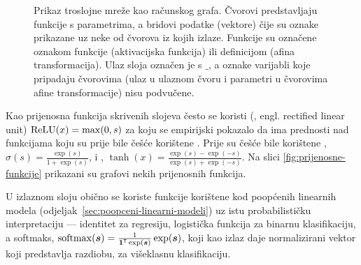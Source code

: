 \documentclass[utf8, diplomski, lmodern]{fer}
\begin{document}
\begin{figure}
	\centering
	\caption{Prikaz troslojne mreže kao računskog grafa. Čvorovi predstavljaju funkcije s parametrima, a bridovi podatke (vektore) čije su oznake prikazane uz neke od čvorova iz kojih izlaze. Funkcije su označene oznakom funkcije (aktivacijska funkcija) ili definicijom (afina transformacija). Ulaz sloja označen je s $\_$, a oznake varijabli koje pripadaju čvorovima (ulaz u ulaznom čvoru i parametri u čvorovima afine transformacije) nisu podvučene.}
	\label{fig:racunski-graf}
\end{figure}

Kao prijenosna funkcija skrivenih slojeva često se koristi  (, engl. rectified linear unit) $\operatorname{ReLU}(x)=\max(0, s)$ za koju se empirijski pokazalo da ima prednosti nad funkcijama koju su prije bile češće korištene \citep{Glorot:2011:DSRNN}. Prije su češće bile korištene , $\sigma(s)=\frac{\exp(s)}{1+\exp(s)}$, i , $\tanh(x)=\frac{\exp(s)-\exp(-s)}{\exp(s)+\exp(-s)}$. Na slici \ref{fig:prijenosne-funkcije} prikazani su grafovi nekih prijenosnih funkcija.

U izlaznom sloju obično se koriste funkcije korištene kod poopćenih linearnih modela (odjeljak~\ref{sec:poopceni-linearni-modeli}) uz istu probabilističku interpretaciju --- identitet za regresiju, logistička funkcija za binarnu klasifikaciju, a softmaks, $\softmax(\vec s)=\frac{1}{\cvec 1^\tp\exp(\vec s)}\exp(\vec s)$, koji kao izlaz daje normalizirani vektor koji predstavlja razdiobu, za višeklasnu klasifikaciju. 
\end{document}
